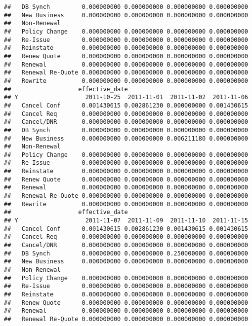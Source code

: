 \documentclass[]{article}
\begin{document}
\begin{verbatim}
##   DB Synch         0.000000000 0.000000000 0.000000000 0.000000000
##   New Business     0.000000000 0.000000000 0.000000000 0.000000000
##   Non-Renewal                                                     
##   Policy Change    0.000000000 0.000000000 0.000000000 0.000000000
##   Re-Issue         0.000000000 0.000000000 0.000000000 0.000000000
##   Reinstate        0.000000000 0.000000000 0.000000000 0.000000000
##   Renew Quote      0.000000000 0.000000000 0.000000000 0.000000000
##   Renewal          0.000000000 0.000000000 0.000000000 0.000000000
##   Renewal Re-Quote 0.000000000 0.000000000 0.000000000 0.000000000
##   Rewrite          0.000000000 0.000000000 0.000000000 0.000000000
##                   effective_date
## Y                   2011-10-25  2011-11-01  2011-11-02  2011-11-06
##   Cancel Conf      0.001430615 0.002861230 0.000000000 0.001430615
##   Cancel Req       0.000000000 0.000000000 0.000000000 0.000000000
##   Cancel/DNR       0.000000000 0.000000000 0.000000000 0.000000000
##   DB Synch         0.000000000 0.000000000 0.000000000 0.000000000
##   New Business     0.000000000 0.000000000 0.006211180 0.000000000
##   Non-Renewal                                                     
##   Policy Change    0.000000000 0.000000000 0.000000000 0.000000000
##   Re-Issue         0.000000000 0.000000000 0.000000000 0.000000000
##   Reinstate        0.000000000 0.000000000 0.000000000 0.000000000
##   Renew Quote      0.000000000 0.000000000 0.000000000 0.000000000
##   Renewal          0.000000000 0.000000000 0.000000000 0.000000000
##   Renewal Re-Quote 0.000000000 0.000000000 0.000000000 0.000000000
##   Rewrite          0.000000000 0.000000000 0.000000000 0.000000000
##                   effective_date
## Y                   2011-11-07  2011-11-09  2011-11-10  2011-11-15
##   Cancel Conf      0.001430615 0.002861230 0.001430615 0.001430615
##   Cancel Req       0.000000000 0.000000000 0.000000000 0.000000000
##   Cancel/DNR       0.000000000 0.000000000 0.000000000 0.000000000
##   DB Synch         0.000000000 0.000000000 0.250000000 0.000000000
##   New Business     0.000000000 0.000000000 0.000000000 0.000000000
##   Non-Renewal                                                     
##   Policy Change    0.000000000 0.000000000 0.000000000 0.000000000
##   Re-Issue         0.000000000 0.000000000 0.000000000 0.000000000
##   Reinstate        0.000000000 0.000000000 0.000000000 0.000000000
##   Renew Quote      0.000000000 0.000000000 0.000000000 0.000000000
##   Renewal          0.000000000 0.000000000 0.000000000 0.000000000
##   Renewal Re-Quote 0.000000000 0.000000000 0.000000000 0.000000000

\end{verbatim}
\end{document}

